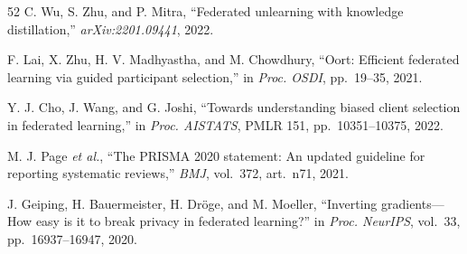 \documentclass[conference]{IEEEtran}
\begin{document}
\begin{thebibliography}{52}
C. Wu, S. Zhu, and P. Mitra, ``Federated unlearning with knowledge distillation,'' \textit{arXiv:2201.09441}, 2022.

F. Lai, X. Zhu, H. V. Madhyastha, and M. Chowdhury, ``Oort: Efficient federated learning via guided participant selection,'' in \textit{Proc. OSDI}, pp.~19--35, 2021.

Y. J. Cho, J. Wang, and G. Joshi, ``Towards understanding biased client selection in federated learning,'' in \textit{Proc. AISTATS}, PMLR 151, pp.~10351--10375, 2022.

M. J. Page \textit{et al.}, ``The PRISMA 2020 statement: An updated guideline for reporting systematic reviews,'' \textit{BMJ}, vol.~372, art.~n71, 2021.


J. Geiping, H. Bauermeister, H. Dr\"oge, and M. Moeller, ``Inverting gradients---How easy is it to break privacy in federated learning?'' in \textit{Proc. NeurIPS}, vol.~33, pp.~16937--16947, 2020.

\end{thebibliography}
\end{document}
